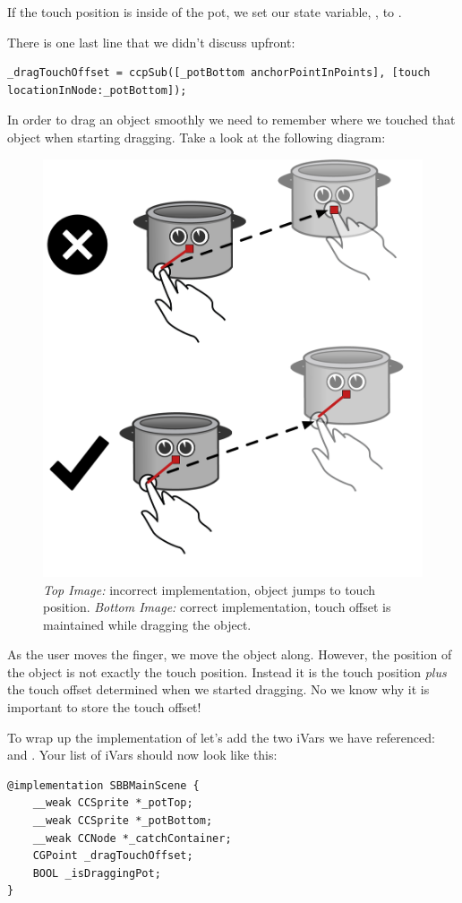 If the touch position is inside of the pot, we set our state variable,
, to . 

There is one last line that we didn't discuss upfront:
\begin{lstlisting}
_dragTouchOffset = ccpSub([_potBottom anchorPointInPoints], [touch locationInNode:_potBottom]);
\end{lstlisting}

In order to drag an object smoothly we need to remember where we touched that
object when starting dragging. Take a look at the following diagram:
\begin{figure}[H]
		\centering
		\includegraphics[width=0.4\linewidth]{images/Chapter3/dragging_offset.png}
		\caption{\textit{Top Image:} incorrect implementation, object jumps to touch
		position. \textit{Bottom Image:} correct implementation, touch offset is
		maintained while dragging the object.}
\end{figure}
As the user moves the finger, we move the object along. However, the position of
the object is not exactly the touch position. Instead it is the touch position
\textit{plus} the touch offset determined when we started dragging. No we know
why it is important to store the touch offset!

\begin{leftbar}
To wrap up the implementation of  let's add the two
iVars we have referenced:  and
. Your list of iVars should now look like this:
\begin{lstlisting}
@implementation SBBMainScene {
    __weak CCSprite *_potTop;
    __weak CCSprite *_potBottom;
    __weak CCNode *_catchContainer;
    CGPoint _dragTouchOffset;
    BOOL _isDraggingPot;
}
\end{lstlisting}
\end{leftbar}